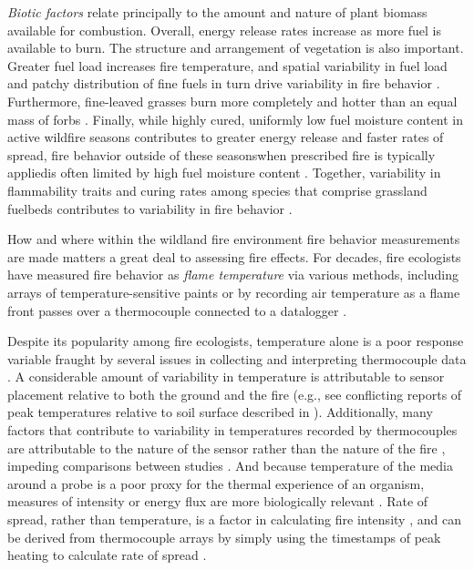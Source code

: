 \documentclass[referee, 
		     sn-basic]{sn-jnl}
\begin{document}
\begin{linenumbers}
\emph{Biotic factors} relate principally to the amount and nature of
plant biomass available for combustion. Overall, energy release rates
increase as more fuel is available to burn. The structure and
arrangement of vegetation is also important. Greater fuel load increases fire temperature, and
spatial variability in fuel load and patchy distribution of fine fuels
in turn drive variability in fire behavior
\citep{patten1984, gibson1990, gomes2020}. Furthermore, fine-leaved
grasses burn more completely and hotter than an equal mass of forbs
\citep{wragg2018}. 
Finally, while highly cured, uniformly low fuel moisture content in active wildfire seasons contributes to greater energy release and faster rates of spread, fire behavior outside of these seasons\textemdash when prescribed fire is typically applied\textemdash is often limited by high fuel moisture content \citep{sparling1966, kidnie2015}.
Together, variability in flammability
traits and curing rates among species that comprise grassland fuelbeds
contributes to variability in fire behavior
\citep{cruz2015, kidnie2015, mcgranahan2016, cardoso2018}.

How and where within the wildland fire environment fire behavior
measurements are made matters a great deal to assessing fire effects.
For decades, fire ecologists have measured fire behavior as \emph{flame
temperature} via various methods, including arrays of
temperature-sensitive paints
\citep[e.g.,][]{whittaker1961, smith1966, bailey1980} or by recording
air temperature as a flame front passes over a thermocouple connected to
a datalogger \citep[e.g.,][]{strong2013, russell2015}.

Despite its popularity among fire ecologists, temperature alone is a
poor response variable fraught by several issues in collecting and
interpreting thermocouple data \citep[see review by][]{mcgranahan2020}.
A considerable amount of variability in temperature is attributable to sensor placement relative to both the ground and the fire (e.g., see conflicting reports of peak temperatures relative to soil surface described in \citet{smith1966, patten1984, archibold2003, ramsay1996, frost1987, bailey1980}). 
Additionally, many factors that contribute to variability in temperatures recorded by thermocouples are attributable to the nature of the sensor rather than the nature of the fire \citep[e.g.,][]{walker1968}, impeding comparisons between studies \citep{bova2008}.
And because temperature of the media around a probe is a poor proxy for the thermal experience of an organism, measures of intensity or energy flux are more biologically relevant \citep{kremens2012, smith2016}.
Rate of spread, rather than temperature, is a factor in calculating fire intensity \citep{byram1959}, and can be derived from  thermocouple arrays by simply using the timestamps of peak heating to calculate rate of spread \citep{mcgranahan2021b, finney2021}. 


\end{linenumbers}
\end{document}
